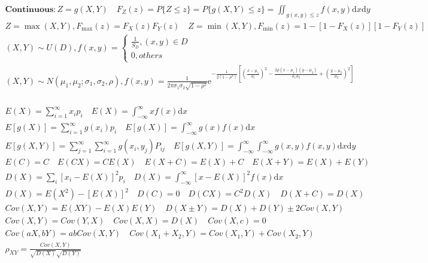 \documentclass{article}
\begin{document}
\begin{align*}
    \bm{Continuous} : Z = g(X,Y) \quad F_{Z}(z)=P\{Z\le z\} = P\{g(X,Y)\le z\} = \iint_{g(x,y)\le z}f(x,y)\mathrm{d}x\mathrm{d}y \\
    Z=\max(X,Y),F_{\max}(z)=F_{X}(z)F_{Y}(z) \quad Z=\min(X,Y),F_{\min}(z)=1-[1-F_{X}(z)][1-F_{Y}(z)] \\ 
    (X,Y) \sim U(D), 
    f(x,y) = \left\{ 
    \begin{array}{rl} 
        \frac{1}{S_{D}}, (x,y) \in D\\ 
        0, others
    \end{array} \right. \ \\ 
    (X,Y) \sim N(\mu_{1},\mu_{2};\sigma_{1},\sigma_{2},\rho),f(x,y) = \frac{1}{2\pi \sigma_{1} \sigma_{2} \sqrt{1-\rho^2}} \mathrm{e}^{-\frac{1}{2(1-\rho^2)}[(\frac{x-\mu_{1}}{\sigma_{1}})^2-\frac{2\rho (x-\mu_{1})(y-\mu_{2})}{\sigma_{1}\sigma_{2}}+(\frac{y-\mu_{2}}{\sigma_{2}})^2]} \\
\end{align*}
\clearpage

\begin{align*}
    E(X) = \sum_{i=1}^{\infty}x_{i}p_{i} \quad E(X) = \int_{-\infty}^{\infty}xf(x)\mathrm{d} x \\  
    E[g(X)] = \sum_{i=1}^{\infty}g(x_{i})p_{i} \quad E[g(X)] = \int_{-\infty}^{\infty}g(x)f(x)\mathrm{d} x \\
    E[g(X,Y)] = \sum_{j=1}^{\infty}\sum_{i=1}^{\infty}g(x_{i},y_{j})P_{ij} \quad E[g(X,Y)] = \int_{-\infty}^{\infty}\int_{-\infty}^{\infty}g(x,y)f(x,y)\mathrm{d}x\mathrm{d}y \\ 
    E(C) = C \quad E(CX) = CE(X) \quad E(X+C) = E(X)+C \quad E(X+Y) = E(X)+E(Y) \\ 
    D(X) = \sum_{i}[x_{i}-E(X)]^2p_{i} \quad D(X) = \int_{-\infty}^{\infty}[x-E(X)]^2f(x)\mathrm{d}x \\ 
    D(X) = E(X^2)-[E(X)]^2 \quad D(C) = 0 \quad D(CX)=C^2D(X) \quad D(X+C) = D(X) \\ 
    Cov(X,Y) = E(XY) - E(X)E(Y) \quad D(X\pm Y) = D(X)+D(Y)\pm 2Cov(X,Y) \\ 
    Cov(X,Y) = Cov(Y,X) \quad Cov(X,X) = D(X) \quad Cov(X,c) = 0 \\ 
    Cov(aX,bY) = abCov(X,Y) \quad Cov(X_{1}+X_{2},Y) = Cov(X_{1},Y)+Cov(X_{2},Y) \\ 
    \rho_{XY} = \frac{Cov(X,Y)}{\sqrt{D(X)}\sqrt{D(Y)}} \\ 
\end{align*}
\end{document}
